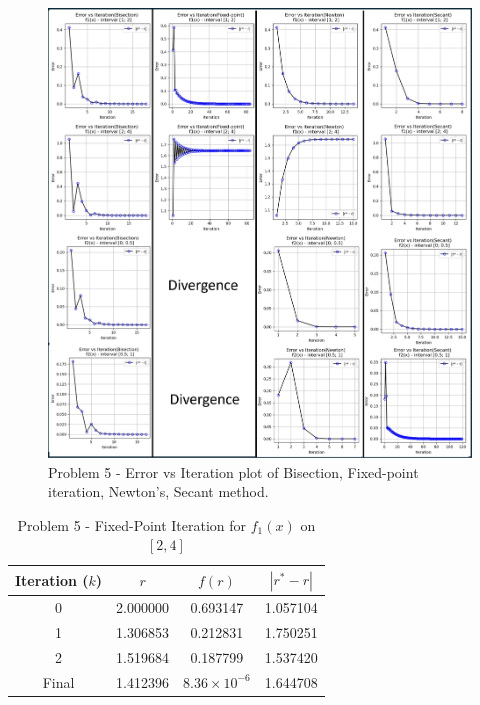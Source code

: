 \documentclass{article} %
\begin{document}
{    \clearpage
    \begin{figure}[h!]
    \centering
    \includegraphics[width=1\textwidth]{generated_image4.png}
    \caption{Problem 5 - Error vs Iteration plot of Bisection, Fixed-point iteration, Newton's, Secant method.}
    \label{fig3}
    \end{figure}

    \clearpage
    \begin{table}[h!]
        \centering
        \begin{tabular}{cccc}
        \toprule
        Iteration ($k$) & $r$ & $f(r)$ & $|r^* - r|$ \\
        \midrule
        0 & 2.000000 & 0.693147 & 1.057104 \\
        1 & 1.306853 & 0.212831 & 1.750251 \\
        2 & 1.519684 & 0.187799 & 1.537420 \\
        Final & 1.412396 & $8.36 \times 10^{-6}$ & 1.644708 \\
        \bottomrule
        \end{tabular}
        \caption{Problem 5 - Fixed-Point Iteration for $f_1(x)$ on $[2, 4]$}
        \label{tab:fixed_f1}
        \end{table}

}
\end{document}

